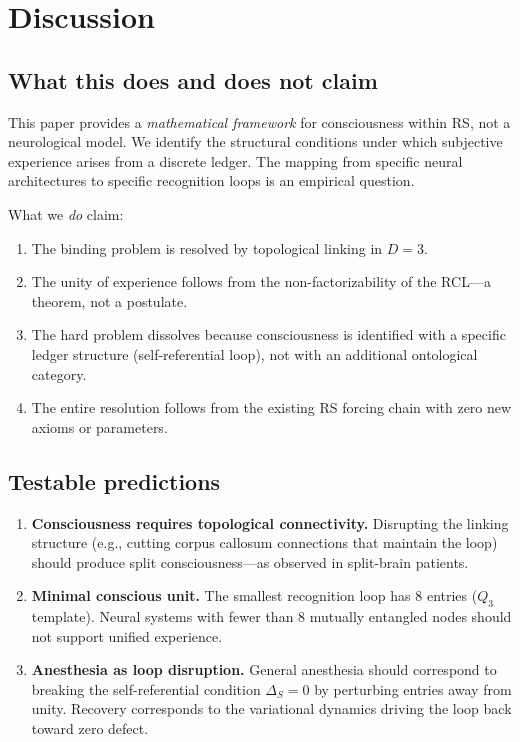 \documentclass[11pt,a4paper]{article}
\theoremstyle{plain}
\theoremstyle{definition}
\theoremstyle{remark}
\begin{document}
\section{Discussion}
\label{sec:discussion}

\subsection{What this does and does not claim}

This paper provides a \emph{mathematical framework} for consciousness
within RS, not a neurological model.  We identify the structural
conditions under which subjective experience arises from a discrete
ledger.  The mapping from specific neural architectures to specific
recognition loops is an empirical question.

What we \emph{do} claim:
\begin{enumerate}[nosep]
\item The binding problem is resolved by topological linking in $D = 3$.
\item The unity of experience follows from the non-factorizability of
  the RCL---a theorem, not a postulate.
\item The hard problem dissolves because consciousness is identified
  with a specific ledger structure (self-referential loop), not with an
  additional ontological category.
\item The entire resolution follows from the existing RS forcing chain
  with zero new axioms or parameters.
\end{enumerate}

\subsection{Testable predictions}

\begin{enumerate}[nosep]
\item \textbf{Consciousness requires topological connectivity.}
  Disrupting the linking structure (e.g., cutting corpus callosum
  connections that maintain the loop) should produce split
  consciousness---as observed in split-brain patients.
\item \textbf{Minimal conscious unit.}  The smallest recognition loop
  has 8 entries ($Q_3$ template).  Neural systems with fewer than 8
  mutually entangled nodes should not support unified experience.
\item \textbf{Anesthesia as loop disruption.}  General anesthesia
  should correspond to breaking the self-referential condition
  $\Delta_S = 0$ by perturbing entries away from unity.  Recovery
  corresponds to the variational dynamics driving the loop back
  toward zero defect.
\end{enumerate}
\end{document}
